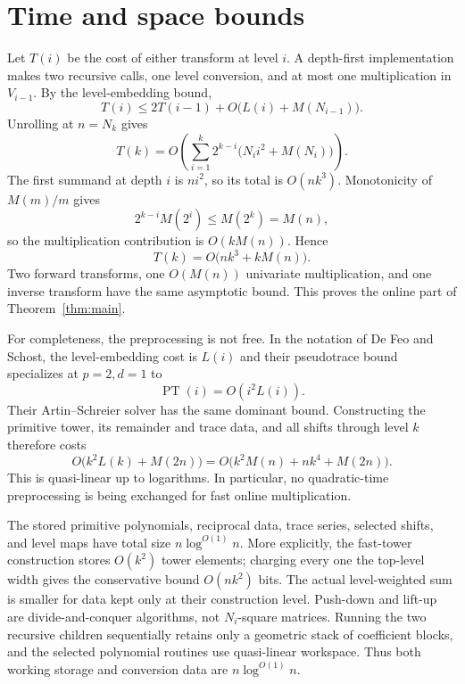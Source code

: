 \documentclass[11pt]{article}
\theoremstyle{definition}
\theoremstyle{remark}
\begin{document}
\section{Time and space bounds}

Let $T(i)$ be the cost of either transform at level $i$.  A depth-first
implementation makes two recursive calls, one level conversion, and at most
one multiplication in $V_{i-1}$.  By the level-embedding bound,
\begin{equation}
  T(i)\leq2T(i-1)
    +O\bigl(L(i)+M(N_{i-1})\bigr).
\end{equation}
Unrolling at $n=N_k$ gives
\[
  T(k)=
  O\left(
    \sum_{i=1}^k2^{k-i}
      \bigl(N_i i^2+M(N_i)\bigr)
  \right).
\]
The first summand at depth $i$ is $ni^2$, so its total is $O(nk^3)$.
Monotonicity of $M(m)/m$ gives
\[
  2^{k-i}M(2^i)\leq M(2^k)=M(n),
\]
so the multiplication contribution is $O(kM(n))$.  Hence
\begin{equation}
  T(k)=O\bigl(nk^3+kM(n)\bigr).
\end{equation}
Two forward transforms, one $O(M(n))$ univariate multiplication, and one
inverse transform have the same asymptotic bound.  This proves the online
part of Theorem~\ref{thm:main}.

For completeness, the preprocessing is not free.  In the notation of
De Feo and Schost, the level-embedding cost is $L(i)$ and their pseudotrace
bound specializes at $p=2,d=1$ to
\[
  \operatorname{PT}(i)=O(i^2L(i)).
\]
Their Artin--Schreier solver has the same dominant bound.  Constructing the
primitive tower, its remainder and trace data, and all shifts through level
$k$ therefore costs
\[
  O\bigl(k^2L(k)+M(2n)\bigr)
  =O\bigl(k^2M(n)+nk^4+M(2n)\bigr).
\]
This is quasi-linear up to logarithms.  In particular, no quadratic-time
preprocessing is being exchanged for fast online multiplication.

The stored primitive polynomials, reciprocal data, trace series, selected
shifts, and level maps have total size $n\log^{O(1)}n$.  More explicitly, the
fast-tower construction stores $O(k^2)$ tower elements; charging every one the
top-level width gives the conservative bound $O(nk^2)$ bits.  The actual
level-weighted sum is smaller for data kept only at their construction level.
Push-down and lift-up are divide-and-conquer algorithms, not $N_i$-square
matrices.  Running the two recursive children sequentially retains only a
geometric stack of coefficient blocks, and the selected polynomial routines
use quasi-linear workspace.  Thus both working storage and conversion data
are $n\log^{O(1)}n$.
\end{document}
